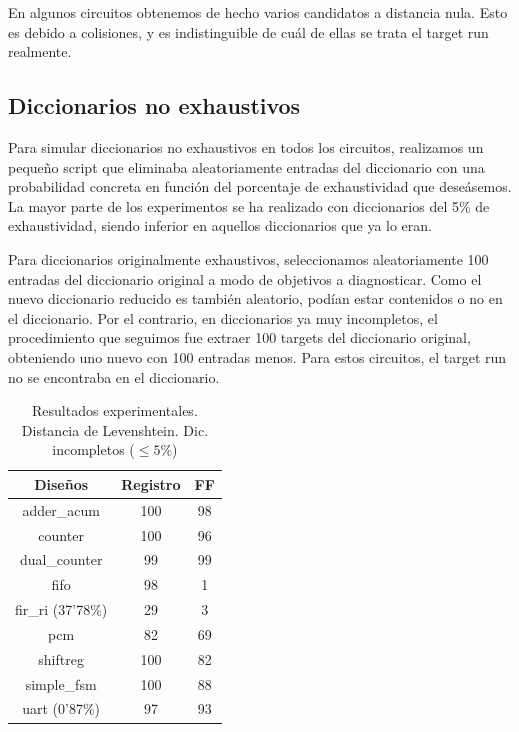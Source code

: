 En algunos circuitos obtenemos de hecho varios candidatos a distancia nula. Esto
es debido a colisiones, y es indistinguible de cuál de ellas se trata el target
run realmente.

\subsection{Diccionarios no exhaustivos}
\label{subsec:LevDicNoExhaust}
Para simular diccionarios no exhaustivos en todos los circuitos, realizamos un
pequeño script que eliminaba aleatoriamente entradas del diccionario con una
probabilidad concreta en función del porcentaje de exhaustividad que deseásemos.
La mayor parte de los experimentos se ha realizado con diccionarios del 5\% de
exhaustividad, siendo inferior en aquellos diccionarios que ya lo eran.

Para diccionarios originalmente exhaustivos, seleccionamos aleatoriamente 100
entradas del diccionario original a modo de objetivos a diagnosticar. Como el
nuevo diccionario reducido es también aleatorio, podían estar contenidos o no en
el diccionario. Por el contrario, en diccionarios ya muy incompletos, el
procedimiento que seguimos fue extraer 100 targets del diccionario original,
obteniendo uno nuevo con 100 entradas menos. Para estos circuitos, el target run
no se encontraba en el diccionario.

\begin{table}[htbp]
    \ttabbox
    {\caption{Resultados experimentales. Distancia de Levenshtein. Dic.
    incompletos ($\leq5\%$)}
    \label{tab:LevenRes}}
    {
        \begin{tabular}{c|c c}
            \hline
            \rule[-8pt]{0pt}{22pt}{\bfseries{Diseños}}&{\bfseries{Registro}}
            &{\bfseries{\gls{FF}}} \\
            \hline
            \rule{0pt}{14pt}adder\_acum & 100 & 98\\
            counter & 100 & 96\\
            dual\_counter & 99 & 99\\
            fifo & 98 & 1\\
            fir\_ri (37'78\%) & 29 & 3\\
            pcm & 82 & 69\\
            shiftreg & 100 & 82\\
            simple\_fsm & 100 & 88\\
            uart (0'87\%) & 97 & 93\\
            \hline
        \end{tabular}
    }
\end{table}

